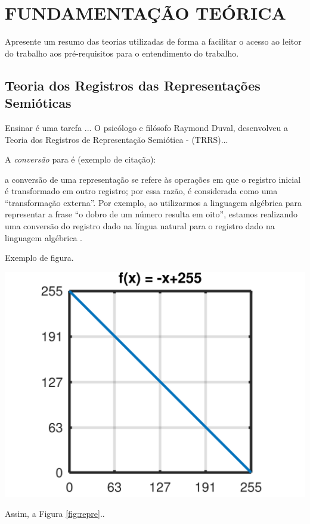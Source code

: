 \chapter{FUNDAMENTAÇÃO TEÓRICA}
\label{cap:2}
\thispagestyle{empty}

Apresente um resumo das teorias utilizadas de forma a facilitar o acesso ao leitor do trabalho aos pré-requisitos para o entendimento do trabalho.

\section{Teoria dos Registros das Representações Semióticas}
\label{3.1}

 Ensinar é uma tarefa ...
O psicólogo e filósofo Raymond Duval, desenvolveu a Teoria dos Registros de Representação Semiótica - (TRRS)... 

A \emph{conversão} para  é (exemplo de citação):

\begin{citacao}
 [...] a conversão de uma representação se refere às operações em que o registro inicial é transformado em outro registro; por essa razão, é considerada como uma “transformação externa”. Por exemplo, ao utilizarmos a linguagem algébrica para representar a frase “o dobro de um número resulta em oito”, estamos realizando uma conversão do registro dado na língua natural para o registro dado na linguagem algébrica \cite[p. 6]{colombo2008}.
\end{citacao}

Exemplo de figura.


\includegraphics[width=0.60\linewidth]{./figuras/funcao.png}


Assim, a Figura \ref{fig:repre}..
	


